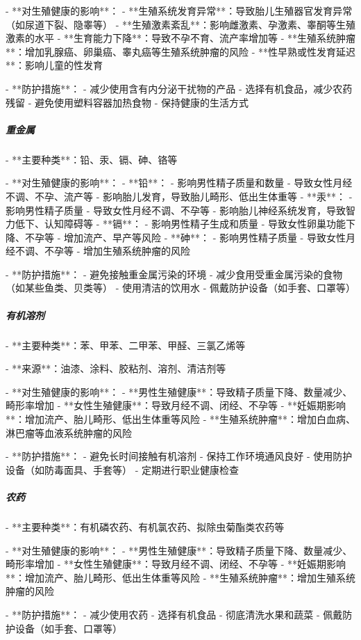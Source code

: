 \begin{enumerate}
- **对生殖健康的影响**：
  - **生殖系统发育异常**：导致胎儿生殖器官发育异常（如尿道下裂、隐睾等）
  - **生殖激素紊乱**：影响雌激素、孕激素、睾酮等生殖激素的水平
  - **生育能力下降**：导致不孕不育、流产率增加等
  - **生殖系统肿瘤**：增加乳腺癌、卵巢癌、睾丸癌等生殖系统肿瘤的风险
  - **性早熟或性发育延迟**：影响儿童的性发育

- **防护措施**：
  - 减少使用含有内分泌干扰物的产品
  - 选择有机食品，减少农药残留
  - 避免使用塑料容器加热食物
  - 保持健康的生活方式

\subparagraph{重金属}

- **主要种类**：铅、汞、镉、砷、铬等

- **对生殖健康的影响**：
  - **铅**：
    - 影响男性精子质量和数量
    - 导致女性月经不调、不孕、流产等
    - 影响胎儿发育，导致胎儿畸形、低出生体重等
  - **汞**：
    - 影响男性精子质量
    - 导致女性月经不调、不孕等
    - 影响胎儿神经系统发育，导致智力低下、认知障碍等
  - **镉**：
    - 影响男性精子生成和质量
    - 导致女性卵巢功能下降、不孕等
    - 增加流产、早产等风险
  - **砷**：
    - 影响男性精子质量
    - 导致女性月经不调、不孕等
    - 增加生殖系统肿瘤的风险

- **防护措施**：
  - 避免接触重金属污染的环境
  - 减少食用受重金属污染的食物（如某些鱼类、贝类等）
  - 使用清洁的饮用水
  - 佩戴防护设备（如手套、口罩等）

\subparagraph{有机溶剂}

- **主要种类**：苯、甲苯、二甲苯、甲醛、三氯乙烯等

- **来源**：油漆、涂料、胶粘剂、溶剂、清洁剂等

- **对生殖健康的影响**：
  - **男性生殖健康**：导致精子质量下降、数量减少、畸形率增加
  - **女性生殖健康**：导致月经不调、闭经、不孕等
  - **妊娠期影响**：增加流产、胎儿畸形、低出生体重等风险
  - **生殖系统肿瘤**：增加白血病、淋巴瘤等血液系统肿瘤的风险

- **防护措施**：
  - 避免长时间接触有机溶剂
  - 保持工作环境通风良好
  - 使用防护设备（如防毒面具、手套等）
  - 定期进行职业健康检查

\subparagraph{农药}

- **主要种类**：有机磷农药、有机氯农药、拟除虫菊酯类农药等

- **对生殖健康的影响**：
  - **男性生殖健康**：导致精子质量下降、数量减少、畸形率增加
  - **女性生殖健康**：导致月经不调、闭经、不孕等
  - **妊娠期影响**：增加流产、胎儿畸形、低出生体重等风险
  - **生殖系统肿瘤**：增加生殖系统肿瘤的风险

- **防护措施**：
  - 减少使用农药
  - 选择有机食品
  - 彻底清洗水果和蔬菜
  - 佩戴防护设备（如手套、口罩等）


\end{enumerate}
